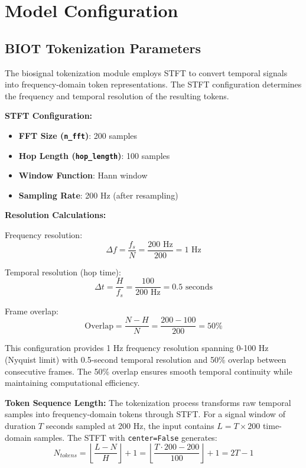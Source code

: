 \newpage

\section{Model Configuration}
\label{sec:model_configuration}

\subsection{BIOT Tokenization Parameters}
\label{sec:tokenization_parameters}

The biosignal tokenization module employs \ac{STFT} to convert temporal signals into frequency-domain token representations. The \ac{STFT} configuration determines the frequency and temporal resolution of the resulting tokens.

\textbf{STFT Configuration:}
\begin{itemize}
    \item \textbf{FFT Size (\texttt{n\_fft})}: 200 samples
    \item \textbf{Hop Length (\texttt{hop\_length})}: 100 samples
    \item \textbf{Window Function}: Hann window
    \item \textbf{Sampling Rate}: 200 Hz (after resampling)
\end{itemize}

\textbf{Resolution Calculations:}

Frequency resolution:
\begin{equation}
\Delta f = \frac{f_s}{N} = \frac{200 \text{ Hz}}{200} = 1 \text{ Hz}
\end{equation}

Temporal resolution (hop time):
\begin{equation}
\Delta t = \frac{H}{f_s} = \frac{100}{200 \text{ Hz}} = 0.5 \text{ seconds}
\end{equation}

Frame overlap:
\begin{equation}
\text{Overlap} = \frac{N - H}{N} = \frac{200 - 100}{200} = 50\%
\end{equation}

This configuration provides 1 Hz frequency resolution spanning 0-100 Hz (Nyquist limit) with 0.5-second temporal resolution and 50\% overlap between consecutive frames. The 50\% overlap ensures smooth temporal continuity while maintaining computational efficiency.

\textbf{Token Sequence Length:} The tokenization process transforms raw temporal samples into frequency-domain tokens through \ac{STFT}. For a signal window of duration $T$ seconds sampled at 200 Hz, the input contains $L = T \times 200$ time-domain samples. The \ac{STFT} with \texttt{center=False} generates:
\begin{equation}
N_{tokens} = \left\lfloor \frac{L - N}{H} \right\rfloor + 1 = \left\lfloor \frac{T \cdot 200 - 200}{100} \right\rfloor + 1 = 2T - 1
\end{equation}

